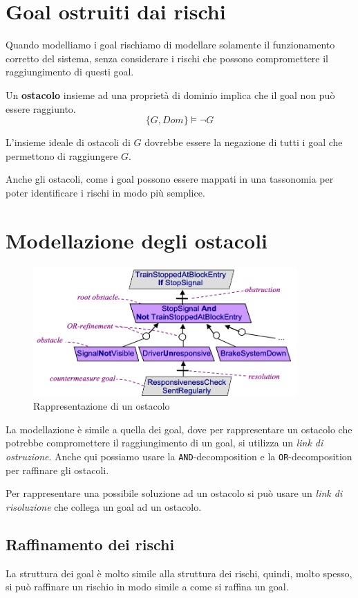 \section{Goal ostruiti dai rischi}
Quando modelliamo i goal rischiamo di modellare solamente il funzionamento 
corretto del sistema, senza considerare i rischi che possono compromettere
il raggiungimento di questi goal. 

Un \textbf{ostacolo} insieme ad una proprietà di dominio implica che il goal
non può essere raggiunto.
\[ 
\{ G, Dom \} \models \neg G
\] 

L'insieme ideale di ostacoli di $G$ dovrebbe essere la negazione di tutti 
i goal che permettono di raggiungere $G$.

Anche gli ostacoli, come i goal possono essere mappati in una tassonomia per 
poter identificare i rischi in modo più semplice.

\section{Modellazione degli ostacoli}
\begin{figure} [H]
    \centering
    \includegraphics[width=0.9\textwidth]{img/ostruzione.png}
    \caption{Rappresentazione di un ostacolo}
\end{figure}
La modellazione è simile a quella dei goal, dove per rappresentare un ostacolo 
che potrebbe compromettere il raggiungimento di un goal, si utilizza un \textit{link di ostruzione}.
Anche qui possiamo usare la \texttt{AND}-decomposition e la \texttt{OR}-decomposition per
raffinare gli ostacoli. 

Per rappresentare una possibile soluzione ad un ostacolo si può
usare un \textit{link di risoluzione} che collega un goal ad un ostacolo.

\subsection{Raffinamento dei rischi}
La struttura dei goal è molto simile alla struttura dei rischi, quindi, molto spesso, 
si può raffinare un rischio in modo simile a come si raffina un goal.

